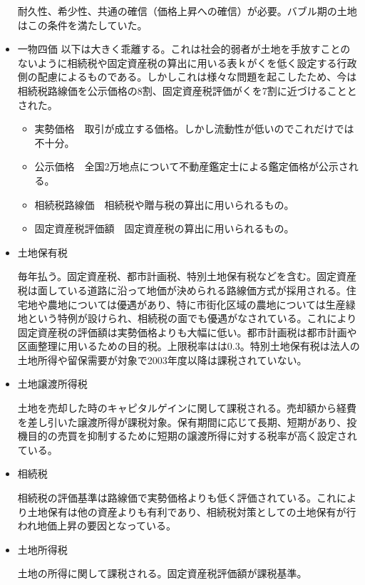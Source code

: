 \documentclass{jsarticle}
\begin{document}
\begin{itemize}
耐久性、希少性、共通の確信（価格上昇への確信）が必要。バブル期の土地はこの条件を満たしていた。
\item 一物四価
以下は大きく乖離する。これは社会的弱者が土地を手放すことのないように相続税や固定資産税の算出に用いる表ｋがくを低く設定する行政側の配慮によるものである。しかしこれは様々な問題を起こしたため、今は相続税路線価を公示価格の8割、固定資産税評価がくを7割に近づけることとされた。
	\begin{itemize}
	\item 実勢価格　取引が成立する価格。しかし流動性が低いのでこれだけでは不十分。
	\item 公示価格　全国2万地点について不動産鑑定士による鑑定価格が公示される。
	\item 相続税路線価　相続税や贈与税の算出に用いられるもの。
	\item 固定資産税評価額　固定資産税の算出に用いられるもの。
	\end{itemize}
\item 土地保有税

毎年払う。固定資産税、都市計画税、特別土地保有税などを含む。固定資産税は面している道路に沿って地価が決められる路線価方式が採用される。住宅地や農地については優遇があり、特に市街化区域の農地については生産緑地という特例が設けられ、相続税の面でも優遇がなされている。これにより固定資産税の評価額は実勢価格よりも大幅に低い。都市計画税は都市計画や区画整理に用いるための目的税。上限税率はは0.3。特別土地保有税は法人の土地所得や留保需要が対象で2003年度以降は課税されていない。
\item 土地譲渡所得税

土地を売却した時のキャピタルゲインに関して課税される。売却額から経費を差し引いた譲渡所得が課税対象。保有期間に応じて長期、短期があり、投機目的の売買を抑制するために短期の譲渡所得に対する税率が高く設定されている。
\item 相続税

相続税の評価基準は路線価で実勢価格よりも低く評価されている。これにより土地保有は他の資産よりも有利であり、相続税対策としての土地保有が行われ地価上昇の要因となっている。
\item 土地所得税

土地の所得に関して課税される。固定資産税評価額が課税基準。
\end{itemize}
\end{document}
